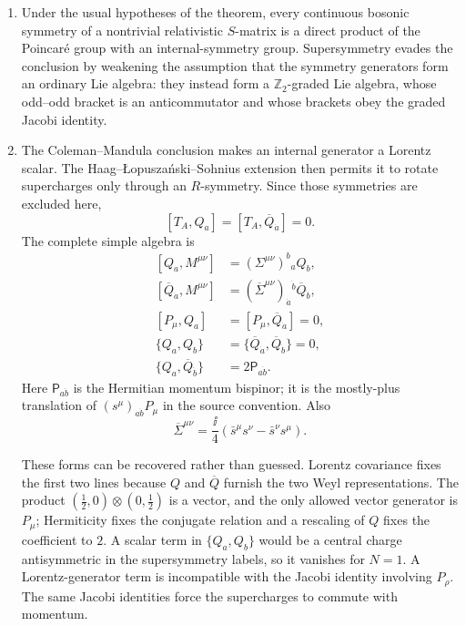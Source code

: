 \begin{enumerate}
  \begin{enumerate}
    \item Under the usual hypotheses of the theorem, every continuous
      bosonic symmetry of a nontrivial relativistic \(S\)-matrix is a
      direct product of the Poincar\'e group with an internal-symmetry
      group.  Supersymmetry evades the conclusion by weakening the
      assumption that the symmetry generators form an ordinary Lie
      algebra: they instead form a \(\mathbb Z_2\)-graded Lie algebra,
      whose odd--odd bracket is an anticommutator and whose brackets obey
      the graded Jacobi identity.

    \item The Coleman--Mandula conclusion makes an internal generator a
      Lorentz scalar.  The Haag--{\L}opusza\'nski--Sohnius extension then
      permits it to rotate supercharges only through an \(R\)-symmetry.
      Since those symmetries are excluded here,
      \[
        [T_A,Q_a]=[T_A,\overline Q_{\dot a}]=0.
      \]
      The complete simple algebra is
      \[
      \begin{aligned}
        [Q_a,M^{\mu\nu}]
          &=(\Sigma^{\mu\nu})^b{}_aQ_b,\\
        [\overline Q_{\dot a},M^{\mu\nu}]
          &=(\overline\Sigma^{\mu\nu})_{\dot a}{}^{\dot b}
            \overline Q_{\dot b},\\
        [P_\mu,Q_a]&=[P_\mu,\overline Q_{\dot a}]=0,\\
        \{Q_a,Q_b\}
          &=\{\overline Q_{\dot a},\overline Q_{\dot b}\}=0,\\
        \{Q_a,\overline Q_{\dot b}\}
          &=2\mathsf P_{a\dot b}.
      \end{aligned}
      \]
      Here \(\mathsf P_{a\dot b}\) is the Hermitian momentum bispinor;
      it is the mostly-plus translation of
      \((s^\mu)_{a\dot b}P_\mu\) in the source convention.  Also
      \[
        \overline\Sigma^{\mu\nu}
          =\frac{\ii}{4}
             (\bar s^\mu s^\nu-\bar s^\nu s^\mu).
      \]

      These forms can be recovered rather than guessed.  Lorentz
      covariance fixes the first two lines because \(Q\) and
      \(\overline Q\) furnish the two Weyl representations.  The product
      \((\tfrac12,0)\otimes(0,\tfrac12)\) is a vector, and the only
      allowed vector generator is \(P_\mu\); Hermiticity fixes the
      conjugate relation and a rescaling of \(Q\) fixes the coefficient
      to \(2\).  A scalar term in \(\{Q_a,Q_b\}\) would be a central
      charge antisymmetric in the supersymmetry labels, so it vanishes
      for \(N=1\).  A Lorentz-generator term is incompatible with the
      Jacobi identity involving \(P_\rho\).  The same Jacobi identities
      force the supercharges to commute with momentum.


\end{enumerate}
\end{enumerate}
